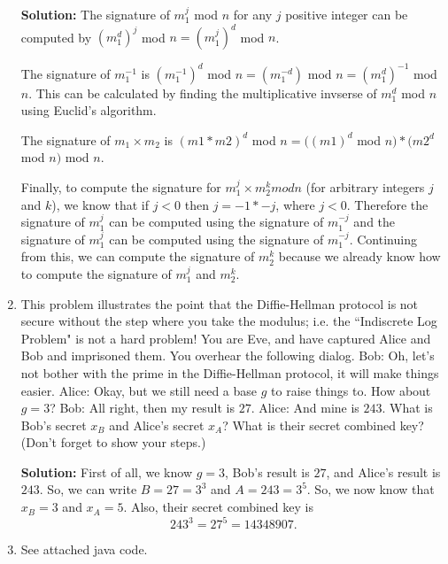 \documentclass[11pt]{article}
\begin{document}
\begin{enumerate}
\textbf{Solution: }
The signature of $m_1^j$ mod $n$ for any $j$ positive integer can be computed by $(m_1^d)^j$ mod $n = (m_1^j)^d$ mod $n$.  

The signature of $m_1^{-1}$ is $(m_1^{-1})^{d}$ mod $n = (m_1^{-d})$ mod $n = (m_1^d)^{-1}$ mod $n$.  This can be calculated by finding the multiplicative invserse of $m_1^d$ mod $n$ using Euclid's algorithm.  

The signature of $m_1 \times m_2$ is $(m1*m2)^d$ mod $n = ((m1)^d$ mod $n) *(m2^d$ mod $n)$ mod $n$.  

Finally, to compute the signature for $m_1^j \times m_2^k mod n$ (for arbitrary integers $j$ and $k$), we know that if $j < 0$ then $j = -1 * -j$, where $j < 0$.  Therefore the signature of $m_1^j$ can be computed using the signature of $m_1^{-j}$ and the signature of $m_1^j$ can be computed using the signature of $m_1^{-j}$.  Continuing from this, we can compute the signature of $m_2^k$ because we already know how to compute the signature of $m_1^j$ and $m_2^k$.  

\item This problem illustrates the point that the Diffie-Hellman protocol is not secure without the step where you take the modulus; i.e. the ``Indiscrete Log Problem" is not a hard problem! You are Eve, and have captured Alice and Bob and imprisoned them.  You overhear the following dialog.  Bob: Oh, let's not bother with the prime in the Diffie-Hellman protocol, it will make things easier.  Alice: Okay, but we still need a base $g$ to raise things to. How about $g=3$?  Bob: All right, then my result is $27$.  Alice: And mine is $243$.  What is Bob's secret $x_B$ and Alice's secret $x_A$? What is their secret combined key? (Don't forget to show your steps.)

\textbf{Solution: }
First of all, we know $g=3$, Bob's result is $27$, and Alice's result is $243$.  So, we can write $B = 27 = 3^3$ and $A = 243 = 3^5$.  So, we now know that $x_B = 3$ and $x_A = 5$.  Also, their secret combined key is $$ 243^3 = 27^5 = 14348907. $$

\item See attached java code.  

\end{enumerate}
\end{document}
